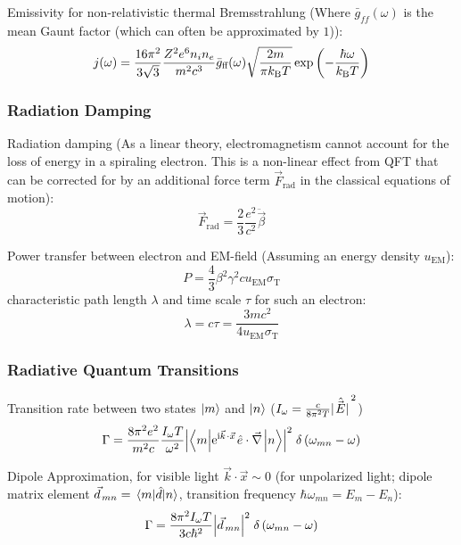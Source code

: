 			\noindent
			Emissivity for non-relativistic thermal Bremsstrahlung (Where $\bar{g}_{ff}(\omega)$ is the mean Gaunt factor (which can often be approximated by $1$)):
			\begin{equation}
				j(\omega) = \frac{16\pi^2}{3\sqrt{3}} \frac{Z^2 e^6 n_i n_e}{m^2 c^3} \bar{g}_{\text{ff}}(\omega) \sqrt{\frac{2m}{\pi k_{\text{B}} T}} \exp\qty(-\frac{\hbar \omega}{k_{\text{B}} T})
			\end{equation}

		\subsubsection{Radiation Damping}
			Radiation damping (As a linear theory, electromagnetism cannot account for the loss of energy in a spiraling electron. This is a non-linear effect from QFT that can be corrected for by an additional force term $\vec{F}_\text{rad}$ in the classical equations of motion):
			\begin{equation}
				\vec{F}_\text{rad} = \frac{2}{3} \frac{e^2}{c^2} \ddot{\vec{\beta}}
			\end{equation}

			\noindent
			Power transfer between electron and EM-field (Assuming an energy density $u_\text{EM}$):
			\begin{equation}
				P = \frac{4}{3} \beta^2 \gamma^2 c u_\text{EM} \sigma_\text{T}
			\end{equation}
			characteristic path length $\lambda$ and time scale $\tau$ for such an electron:
			\begin{equation}
				\lambda = c\tau = \frac{3 m c^2}{4 u_\text{EM} \sigma_\text{T}}
			\end{equation}

		\subsubsection{Radiative Quantum Transitions}
			Transition rate between two states $\Ket{m}$ and $\Ket{n}$ ($I_\omega = \frac{c}{8 \pi^2 T} \abs*{\hat{\vec{E}}}^2$)
			\begin{equation}
				\Gamma = \frac{8\pi^{2}e^{2}}{m^{2}c}\frac{I_{\omega}T}{\omega^{2}}\abs{\mel**{m}{\mathrm{e}^{\mathrm{i}\vec{k}\cdot\vec{x}}\hat{e}\cdot\vec{\nabla}}{n}}^{2}\;\delta\left(\omega_{m n}-\omega\right)
			\end{equation}

			\noindent
			Dipole Approximation, for visible light $\vec{k}\cdot\vec{x}\sim 0$ (for unpolarized light; dipole matrix element $\vec{d}_{mn} = \mel{m}{\hat{d}}{n}$, transition frequency $\hbar \omega_{mn} = E_m - E_n$):
			\begin{equation}
				\Gamma = \frac{8\pi^{2}I_\omega T}{3 c \hbar^2}\abs{\vec{d}_{mn}}^{2}\;\delta\left(\omega_{m n}-\omega\right)
			\end{equation}

